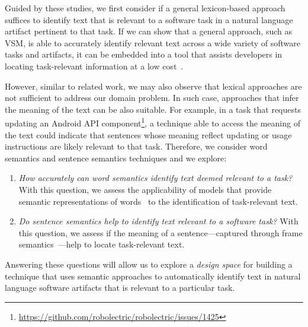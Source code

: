 Guided by these studies, we first consider if a general lexicon-based approach suffices to identify text that is relevant to a software task in a natural language artifact pertinent to that task. If we can show that a general approach, such as \acs{VSM}, is able to accurately identify relevant text across a wide variety of software tasks and artifacts, 
it can be embedded into a tool that assists developers in locating task-relevant information at a low cost~\cite{Rastkar2013}.


However, similar to related work, we may also observe that lexical approaches are not sufficient to address our domain problem. In such case, approaches that infer the meaning of the text can be also suitable.
For example, in a task that requests updating an Android API component\footnote{\url{https://github.com/robolectric/robolectric/issues/1425}}, a technique
able to access the meaning of the text could indicate that sentences whose meaning reflect updating or usage instructions
are likely relevant to that task. Therefore, we consider 
word semantics and sentence semantics techniques and we explore: 



\begin{enumerate}[label=\textit{RQ\arabic*}]

    \item \textit{How accurately can word semantics identify text deemed relevant to a task?}
    With this question, we assess the applicability of models that provide semantic representations of words~\cite{Mikolov2013, Devlin2018Bert}  to the identification of  task-relevant text.
    
    
    \item \textit{Do sentence semantics help to identify text relevant to a software task?}
    With this question, we assess if the meaning of a sentence---captured through frame semantics~\cite{fillmore1976frame}---help to locate task-relevant text.
\end{enumerate}


Answering these questions will allow us to explore a \textit{design space} for building a technique that uses semantic approaches to automatically identify text in natural language software artifacts that is relevant to a particular task.